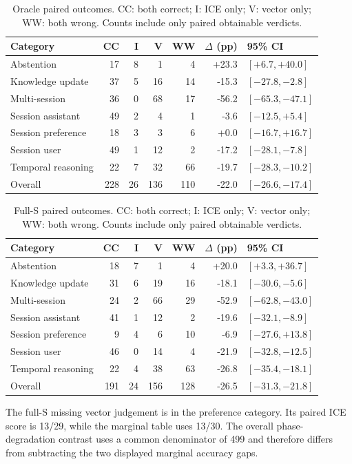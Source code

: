 \documentclass[twoside,11pt]{article}
\begin{document}
\begin{table}[htbp]
\centering\small


\begin{tabular}{@{}lrrrrrl@{}}\toprule
Category & CC & I & V & WW & $\Delta$ (pp) & 95\% CI\\\midrule
Abstention & 17 & 8 & 1 & 4 & +23.3 & $[+6.7,+40.0]$\\
Knowledge update & 37 & 5 & 16 & 14 & -15.3 & $[-27.8,-2.8]$\\
Multi-session & 36 & 0 & 68 & 17 & -56.2 & $[-65.3,-47.1]$\\
Session assistant & 49 & 2 & 4 & 1 & -3.6 & $[-12.5,+5.4]$\\
Session preference & 18 & 3 & 3 & 6 & +0.0 & $[-16.7,+16.7]$\\
Session user & 49 & 1 & 12 & 2 & -17.2 & $[-28.1,-7.8]$\\
Temporal reasoning & 22 & 7 & 32 & 66 & -19.7 & $[-28.3,-10.2]$\\
Overall & 228 & 26 & 136 & 110 & -22.0 & $[-26.6,-17.4]$\\
\bottomrule\end{tabular}
\caption{Oracle paired outcomes. CC: both correct; I: ICE only; V: vector only; WW: both wrong. Counts include only paired obtainable verdicts.}
\label{tab:paired-oracle}
\end{table}

\begin{table}[htbp]
\centering\small


\begin{tabular}{@{}lrrrrrl@{}}\toprule
Category & CC & I & V & WW & $\Delta$ (pp) & 95\% CI\\\midrule
Abstention & 18 & 7 & 1 & 4 & +20.0 & $[+3.3,+36.7]$\\
Knowledge update & 31 & 6 & 19 & 16 & -18.1 & $[-30.6,-5.6]$\\
Multi-session & 24 & 2 & 66 & 29 & -52.9 & $[-62.8,-43.0]$\\
Session assistant & 41 & 1 & 12 & 2 & -19.6 & $[-32.1,-8.9]$\\
Session preference & 9 & 4 & 6 & 10 & -6.9 & $[-27.6,+13.8]$\\
Session user & 46 & 0 & 14 & 4 & -21.9 & $[-32.8,-12.5]$\\
Temporal reasoning & 22 & 4 & 38 & 63 & -26.8 & $[-35.4,-18.1]$\\
Overall & 191 & 24 & 156 & 128 & -26.5 & $[-31.3,-21.8]$\\
\bottomrule\end{tabular}
\caption{Full-S paired outcomes. CC: both correct; I: ICE only; V: vector only; WW: both wrong. Counts include only paired obtainable verdicts.}
\label{tab:paired-full}
\end{table}
The full-S missing vector judgement is in the preference category. Its paired ICE score is 13/29, while the marginal table uses 13/30. The overall phase-degradation contrast uses a common denominator of 499 and therefore differs from subtracting the two displayed marginal accuracy gaps.
\end{document}
